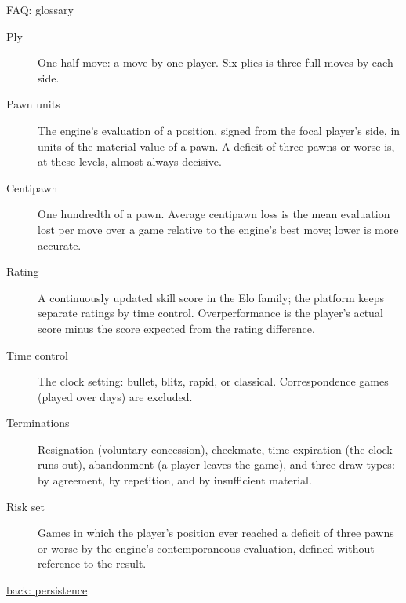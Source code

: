 \documentclass[aspectratio=169,11pt,t]{beamer}
\newcommand{\backto}[2]{\vfill\hfill\hyperlink{#1}{\textcolor{linkblue}{\scriptsize\textsf{back: #2}}}}
\begin{document}
\begin{frame}[label=faq-glossary]{FAQ: glossary}
  \footnotesize
  \begin{description}
    \item[Ply] One half-move: a move by one player. Six plies is three full moves by each side.
    \item[Pawn units] The engine's evaluation of a position, signed from the focal player's side, in units of the material value of a pawn. A deficit of three pawns or worse is, at these levels, almost always decisive.
    \item[Centipawn] One hundredth of a pawn. Average centipawn loss is the mean evaluation lost per move over a game relative to the engine's best move; lower is more accurate.
    \item[Rating] A continuously updated skill score in the Elo family; the platform keeps separate ratings by time control. Overperformance is the player's actual score minus the score expected from the rating difference.
    \item[Time control] The clock setting: bullet, blitz, rapid, or classical. Correspondence games (played over days) are excluded.
    \item[Terminations] Resignation (voluntary concession), checkmate, time expiration (the clock runs out), abandonment (a player leaves the game), and three draw types: by agreement, by repetition, and by insufficient material.
    \item[Risk set] Games in which the player's position ever reached a deficit of three pawns or worse by the engine's contemporaneous evaluation, defined without reference to the result.
  \end{description}
  \backto{persistence}{persistence}
\end{frame}
\end{document}
